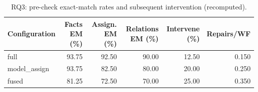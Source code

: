 \begin{table}[!htbp]
\centering
\caption{RQ3: pre-check exact-match rates and subsequent intervention (recomputed).}
\label{tab:rq3-precheck}
\footnotesize\setlength{\tabcolsep}{3pt}
\begin{tabular*}{\linewidth}{@{\extracolsep{\fill}}lrrrrr@{}}
\toprule
Configuration & Facts EM (\%) & Assign. EM (\%) & Relations EM (\%) & Intervene (\%) & Repairs/WF \\
\midrule
full & 93.75 & 92.50 & 90.00 & 12.50 & 0.150 \\
model_assign & 93.75 & 82.50 & 80.00 & 20.00 & 0.250 \\
fused & 81.25 & 72.50 & 70.00 & 25.00 & 0.350 \\
\bottomrule
\end{tabular*}
\end{table}
